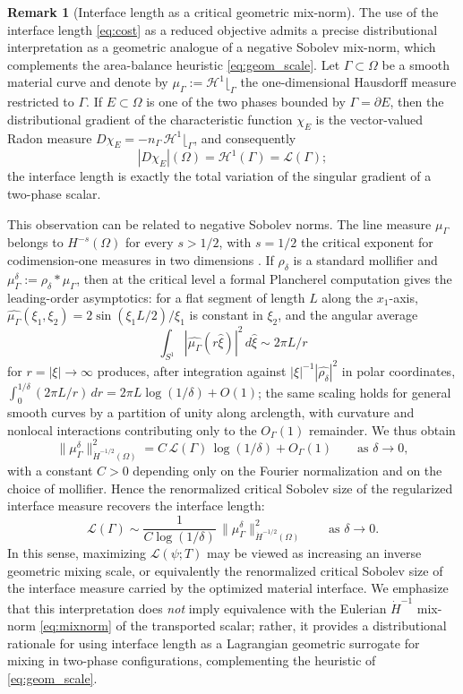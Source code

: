 \documentclass[12pt, reqno]{amsart}
\theoremstyle{plain}
\theoremstyle{definition}
\newtheorem{remark}[thm]{Remark}
\numberwithin{equation}{section}
\numberwithin{figure}{section}
\numberwithin{algorithm}{section}
\begin{document}
\begin{remark}[Interface length as a critical geometric mix-norm]\label{rem:critical_mixnorm}
The use of the interface length \eqref{eq:cost} as a reduced objective admits a precise distributional interpretation as a geometric analogue of a negative Sobolev mix-norm, which complements the area-balance heuristic \eqref{eq:geom_scale}. Let $\Gamma\subset\Omega$ be a smooth material curve and denote by $\mu_\Gamma:=\mathcal H^1\!\lfloor_\Gamma$ the one-dimensional Hausdorff measure restricted to $\Gamma$. If $E\subset\Omega$ is one of the two phases bounded by $\Gamma=\partial E$, then the distributional gradient of the characteristic function $\chi_E$ is the vector-valued Radon measure $D\chi_E=-n_\Gamma\,\mathcal H^1\!\lfloor_\Gamma$, and consequently
\[
|D\chi_E|(\Omega)=\mathcal H^1(\Gamma)=\mathcal L(\Gamma);
\] the interface length is exactly the total variation of the singular gradient of a two-phase scalar.

This observation can be related to negative Sobolev norms. The line measure $\mu_\Gamma$ belongs to $H^{-s}(\Omega)$ for every $s>1/2$, with $s=1/2$ the critical exponent for codimension-one measures in two dimensions \cite[Ch.~12]{mattila1995geometry}. If $\rho_\delta$ is a standard mollifier and $\mu_\Gamma^\delta:=\rho_\delta\ast\mu_\Gamma$, then at the critical level a formal Plancherel computation gives the leading-order asymptotics: for a flat segment of length $L$ along the $x_1$-axis, $\widehat{\mu_\Gamma}(\xi_1,\xi_2)=2\sin(\xi_1L/2)/\xi_1$ is constant in $\xi_2$, and the angular average $$\int_{S^1}|\widehat{\mu_\Gamma}(r\hat\xi)|^2\,d\hat\xi\sim 2\pi L/r$$ for $r=|\xi|\to\infty$ produces, after integration against $|\xi|^{-1}|\widehat{\rho_\delta}|^2$ in polar coordinates, $\int_0^{1/\delta}(2\pi L/r)\,dr=2\pi L\log(1/\delta)+O(1)$; the same scaling holds for general smooth curves by a partition of unity along arclength, with curvature and nonlocal interactions contributing only to the $O_\Gamma(1)$ remainder. We thus obtain
\[
\|\mu_\Gamma^\delta\|_{\dot{H}^{-1/2}(\Omega)}^2=C\,\mathcal L(\Gamma)\,\log(1/\delta)+O_\Gamma(1)\qquad\text{as }\delta\to 0,
\]
with a constant $C>0$ depending only on the Fourier normalization and on the choice of mollifier. Hence the renormalized critical Sobolev size of the regularized interface measure recovers the interface length:
\[
\mathcal L(\Gamma)\sim\frac{1}{C\log(1/\delta)}\,\|\mu_\Gamma^\delta\|_{\dot{H}^{-1/2}(\Omega)}^2\qquad\text{as }\delta\to 0.
\]
In this sense, maximizing $\mathcal L(\psi;T)$ may be viewed as increasing an inverse geometric mixing scale, or equivalently the renormalized critical Sobolev size of the interface measure carried by the optimized material interface. We emphasize that this interpretation does \emph{not} imply equivalence with the Eulerian $\dot{H}^{-1}$ mix-norm \eqref{eq:mixnorm} of the transported scalar; rather, it provides a distributional rationale for using interface length as a Lagrangian geometric surrogate for mixing in two-phase configurations, complementing the heuristic of \eqref{eq:geom_scale}.
\end{remark}
\end{document}
